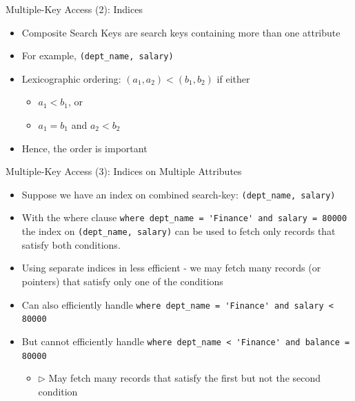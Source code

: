 \documentclass[aspectratio=169, xcolor=dvipsnames]{beamer}
\begin{document}
\begin{frame}[fragile]{Multiple-Key Access (2): Indices}
    \begin{itemize}[<+->]
        \item Composite Search Keys are search keys containing more than one attribute
        \item For example, \verb|(dept_name, salary)|
        \item Lexicographic ordering: $(a_1, a_2) < (b_1, b_2)$ if either
        \begin{itemize}[<+->]
            \item $a_1 < b_1$, or
            \item $a_1 = b_1$ and $a_2 < b_2$
        \end{itemize}
        \item Hence, the order is important
    \end{itemize}
\end{frame}

\begin{frame}[fragile]{Multiple-Key Access (3): Indices on Multiple Attributes}
    \begin{itemize}[<+->]
        \item Suppose we have an index on combined search-key: \verb|(dept_name, salary)|
        \item With the where clause
        \verb|where dept_name = 'Finance' and salary = 80000|
        the index on \verb|(dept_name, salary)| can be used to fetch only records that satisfy both conditions.
        \item Using separate indices in less efficient - we may fetch many records (or pointers) that satisfy only one of the conditions
        \item Can also efficiently handle
        \verb|where dept_name = 'Finance' and salary < 80000|
        \item But cannot efficiently handle
        \verb|where dept_name < 'Finance' and balance = 80000|
        \begin{itemize}
            \item $\triangleright$ May fetch many records that satisfy the first but not the second condition
        \end{itemize}
    \end{itemize}
\end{frame}
\end{document}
